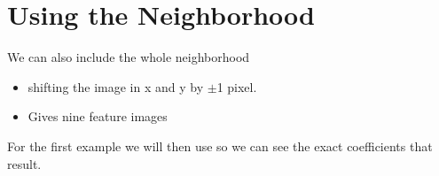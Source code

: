 \documentclass[letterpaper,10pt,english]{sphinxmanual}
\begin{document}
\begin{sphinxVerbatim}[commandchars=\\\{\}]
  

\PYG{p}{[}  \PYG{p}{]}    
\end{sphinxVerbatim}

\noindent{}


\section{Using the Neighborhood}
\label{\detokenize{05-SupervisedSegmentation:using-the-neighborhood}}
\sphinxAtStartPar
We can also include the whole neighborhood
\begin{itemize}
\item {} 
\sphinxAtStartPar
shifting the image in x and y by \(\pm\)1 pixel.

\item {} 
\sphinxAtStartPar
Gives nine feature images

\end{itemize}

\sphinxAtStartPar
For the first example we will then use  so we can see the exact coefficients that result.
\end{document}
